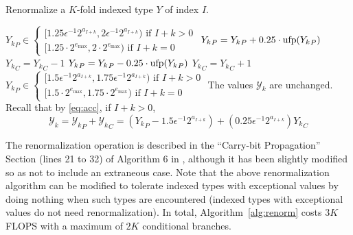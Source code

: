     \begin{samepage}
    \begin{alg}
      Renormalize a $K$-fold indexed type $Y$ of index $I$.
      \begin{algorithmic}[1]
        \Require
        \Statex ${Y_k}_P \in \begin{cases}[1.25  \epsilon^{-1} 2^{a_{I + k}}, 2  \epsilon^{-1} 2^{a_{I + k}}) \text{ if } I + k > 0 \\ [1.25 \cdot 2^{e_{\max}}, 2 \cdot 2^{e_{\max}}) \text{ if } I + k = 0\end{cases} $
              \State ${Y_k}_P = {Y_k}_P + 0.25 \cdot \text{ufp}({Y_k}_P)$
              \State ${Y_k}_C = {Y_k}_C - 1$
            \EndIf
              \State ${Y_k}_P = {Y_k}_P - 0.25 \cdot \text{ufp}({Y_k}_P)$
              \State ${Y_k}_C = {Y_k}_C + 1$
            \EndIf
          \EndFor
        \EndFunction
        \Ensure
          \Statex ${Y_k}_P \in \begin{cases}[1.5  \epsilon^{-1} 2^{a_{I + k}}, 1.75  \epsilon^{-1} 2^{a_{I + k}}) \text{ if } I + k > 0 \\ [1.5 \cdot 2^{e_{\max}}, 1.75 \cdot 2^{e_{\max}}) \text{ if } I + k = 0\end{cases} $
          \Statex The values $\mathcal{Y}_k$ are unchanged. Recall that by \eqref{eq:acc}, if $I + k > 0$,
          \begin{equation*}
            \mathcal{Y}_k = {\mathcal{Y}_k}_P + {\mathcal{Y}_k}_C = ({Y_k}_P - 1.5 \epsilon^{-1} 2^{a_{I + k}}) + (0.25\epsilon^{-1}2^{a_{I + k}}){Y_k}_C
          \end{equation*}
      \end{algorithmic}
      \label{alg:renorm}
    \end{alg}
    \end{samepage}
    The renormalization operation is described in the ``Carry-bit Propagation''
    Section (lines 21 to 32) of Algorithm $6$ in \cite{repsum}, although it has
    been slightly modified so as not to include an extraneous case. Note that
    the above renormalization algorithm can be modified to tolerate
    indexed types with exceptional values by doing nothing when such types are
    encountered (indexed types with exceptional values do not need
    renormalization).
    In total, Algorithm~\ref{alg:renorm} costs $3K$ FLOPS with a maximum of
    $2K$ conditional branches.

